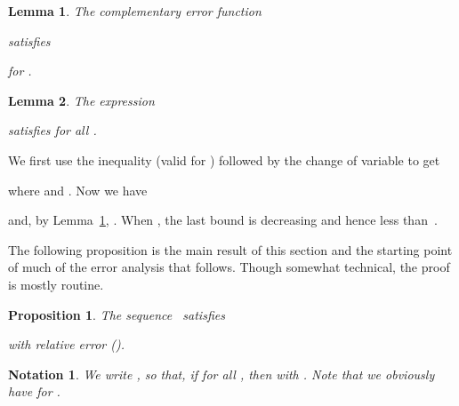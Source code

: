 \documentclass[10pt, conference]{IEEEtran}
\newtheorem{lemma}{Lemma}
\newtheorem{notation}{Notation}
\newtheorem{proposition}{Proposition}
\begin{document}
\begin{lemma}
  \label{lem:erf}The complementary error function
  
  satisfies
  
  for .
\end{lemma}

\begin{lemma} \label{lem:int} \mightbeomitted
  \label{lem:I2-I1}The expression
  
  satisfies  for all .
\end{lemma}

\begin{IEEEproof}
  We first use the inequality  (valid for )
  followed by the change of variable  to get
  
  where  and . Now we have
  
  and, by Lemma~\ref{lem:erf},
  .
  When , the last bound is decreasing and hence less than~.
\end{IEEEproof}

The following proposition is the main result of this section and the starting point of much of the error analysis that follows.
Though somewhat technical, the proof is mostly routine.

\begin{proposition}
  \label{prop:bound on Gn}The sequence~ satisfies
  
  with relative error
   \hspace{1em}().
\end{proposition}

\begin{notation} \label{not:E}
  We write
  ,
  so that, if  for all , then  with .
  Note that we obviously have  for .
\end{notation}
\end{document}
